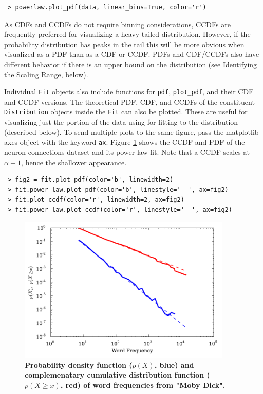 \documentclass[10pt]{article}
\begin{document}
 \begin{verbatim}
 > powerlaw.plot_pdf(data, linear_bins=True, color='r')
 \end{verbatim}
 
 As CDFs and CCDFs do not require binning considerations, CCDFs are frequently preferred for visualizing a heavy-tailed distribution. %
 However, if the probability distribution has peaks in the tail this will be more obvious when visualized as a PDF than as a CDF or CCDF. PDFs and CDF/CCDFs also have different behavior if there is an upper bound on the distribution (see Identifying the Scaling Range, below).
 
 Individual \verb$Fit$ objects also include functions for \verb$pdf$, \verb$plot_pdf$, and their CDF and CCDF versions. The theoretical PDF, CDF, and CCDFs of the constituent \verb$Distribution$ objects inside the \verb$Fit$ can also be plotted. These are useful for visualizing just the portion of the data using for fitting to the distribution (described below). To send multiple plots to the same figure, pass the matplotlib axes object with the keyword \verb$ax$.  Figure \ref{CCDF} shows the CCDF and PDF of the neuron connections dataset and its power law fit. Note that a CCDF scales at $\alpha-1$, hence the shallower appearance.
 
 \begin{verbatim}
 > fig2 = fit.plot_pdf(color='b', linewidth=2)
 > fit.power_law.plot_pdf(color='b', linestyle='--', ax=fig2)
 > fit.plot_ccdf(color='r', linewidth=2, ax=fig2)
 > fit.power_law.plot_ccdf(color='r', linestyle='--', ax=fig2)
 \end{verbatim}
 
\begin{figure}[!ht]
\begin{center}
\includegraphics[width=4in]{FigCCDF.pdf}
\end{center}
\caption{
{\bf Probability density function ($p(X)$, blue) and complemenatary cumulative distribution function ($p(X\geq x)$, red) of word frequencies from "Moby Dick".}
}
\label{CCDF}
\end{figure}
\end{document}
